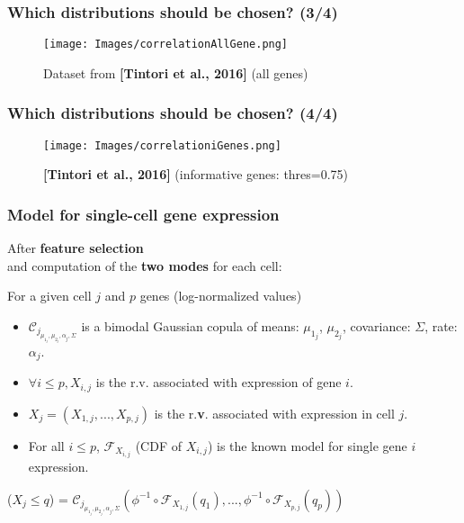 \documentclass{beamer}
\begin{document}
\begin{frame}
\frametitle{Which distributions should be chosen? (3/4)}

\begin{figure}
\centering
\texttt{[image: Images/correlationAllGene.png]}
\caption{Dataset from \textbf{[Tintori et al., 2016]} (all genes)}
\end{figure}

\end{frame}

\begin{frame}
\frametitle{Which distributions should be chosen? (4/4)}

\begin{figure}
\centering
\texttt{[image: Images/correlationiGenes.png]}
\caption{\textbf{[Tintori et al., 2016]} (informative genes: thres=0.75)}
\end{figure}

\end{frame}

\begin{frame}
\frametitle{Model for single-cell gene expression}

After \textbf{feature selection}\\and computation of the \textbf{two modes} for each cell:
\pause
\begin{alertblock}{For a given cell $j$ and $p$ genes (log-normalized values)} 

\begin{itemize}
\item $\mathscr{C}_j_{\mu_1_j, \mu_2_j, \alpha_j, \Sigma}$ is a bimodal Gaussian copula of means: $\mu_1_j$, $\mu_2_j$, covariance: $\Sigma$, rate: $\alpha_j$.
\pause
\item $\forall i \leq p, X_{i,j}$ is the r.v. associated with expression of gene $i$.
\item $X_j = (X_{1,j}, ..., X_{p, j})$ is the r.\textbf{v}. associated with expression in cell $j$.
\pause
\item For all $i \leq p$, $\mathscr{F}_{X_{i,j}}$ (CDF of $X_{i,j}$) is the known model for single gene $i$ expression.
\end{itemize}
\pause
\begin{flushcenter} 
($X_j \leq q$) = $\mathscr{C}_j_{\mu_1_j, \mu_2_j, \alpha_j, \Sigma}(\phi^{-1} \circ \mathscr{F}_{X_{1,j}}(q_1), ..., \phi^{-1} \circ \mathscr{F}_{X_{p,j}}(q_p))$\end{flushcenter}
\end{alertblock}
\end{frame}
\end{document}
